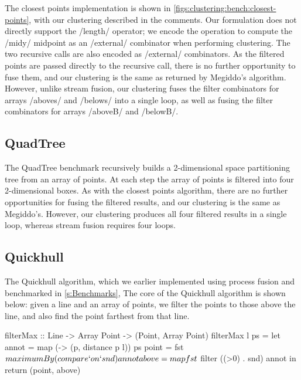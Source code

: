The closest points implementation is shown in \cref{figs:clustering:bench:closest-points}, with our clustering described in the comments.
Our formulation does not directly support the \Hs/length/ operator; we encode the operation to compute the \Hs/midy/ midpoint as an \Hs/external/ combinator when performing clustering.
The two recursive calls are also encoded as \Hs/external/ combinators.
As the filtered points are passed directly to the recursive call, there is no further opportunity to fuse them, and our clustering is the same as returned by Megiddo's algorithm.
However, unlike stream fusion, our clustering fuses the filter combinators for arrays \Hs/aboves/ and \Hs/belows/ into a single loop, as well as fusing the filter combinators for arrays \Hs/aboveB/ and \Hs/belowB/.


\subsection{QuadTree}
The QuadTree benchmark recursively builds a 2-dimensional space partitioning tree from an array of points. At each step the array of points is filtered into four 2-dimensional boxes. As with the closest points algorithm, there are no further opportunities for fusing the filtered results, and our clustering is the same as Megiddo's. However, our clustering produces all four filtered results in a single loop, whereas stream fusion requires four loops.


\subsection{Quickhull}
The Quickhull algorithm, which we earlier implemented using process fusion and benchmarked in \cref{s:Benchmarks}, 
The core of the Quickhull algorithm is shown below: given a line and an array of points, we filter the points to those above the line, and also find the point farthest from that line.


\begin{haskell}
filterMax :: Line -> Array Point -> (Point, Array Point)
filterMax l ps
 = let annot = map (\p -> (p, distance p l)) ps
       point = fst
             $ maximumBy (compare `on` snd) annot
       above = map fst
             $ filter ((>0) . snd) annot
   in return (point, above)
\end{haskell}


